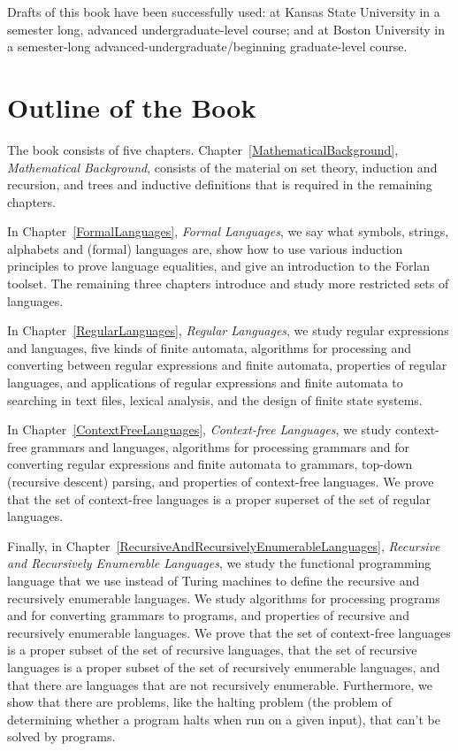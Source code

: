 Drafts of this book have been successfully used: at Kansas State
University in a semester long, advanced undergraduate-level course;
and at Boston University in a semester-long
advanced-undergraduate/beginning graduate-level course.

\section*{Outline of the Book}
\label{OutlineOfTheBook}

The book consists of five chapters.
Chapter~\ref{MathematicalBackground}, \emph{Mathematical Background},
consists of the material on set theory, induction and recursion, and
trees and inductive definitions that is required in the remaining
chapters.

In Chapter~\ref{FormalLanguages}, \emph{Formal Languages},
we say what symbols, strings, alphabets and (formal) languages are,
show how to use various induction principles to prove language
equalities, and give an introduction to the Forlan toolset.  The
remaining three chapters introduce and study more restricted sets of
languages.

In Chapter~\ref{RegularLanguages}, \emph{Regular Languages}, we study
regular expressions and languages, five kinds of finite automata,
algorithms for processing and converting between regular expressions
and finite automata, properties of regular languages, and applications
of regular expressions and finite automata to searching in text files,
lexical analysis, and the design of finite state systems.

In Chapter~\ref{ContextFreeLanguages}, \emph{Context-free Languages},
we study context-free grammars and languages, algorithms for
processing grammars and for converting regular expressions and finite
automata to grammars, top-down (recursive descent) parsing, and
properties of context-free languages.  We prove that the set of context-free
languages is a proper superset of the set of regular languages.

Finally, in Chapter~\ref{RecursiveAndRecursivelyEnumerableLanguages},
\emph{Recursive and Recursively Enumerable Languages}, we study the
functional programming language that we use instead of Turing machines
to define the recursive and recursively enumerable languages.  We
study algorithms for processing programs and for converting grammars
to programs, and properties of recursive and recursively enumerable
languages.  We prove that the set of context-free languages is a
proper subset of the set of recursive languages, that the set of
recursive languages is a proper subset of the set of recursively
enumerable languages, and that there are languages that are not
recursively enumerable.  Furthermore, we show that there are problems,
like the halting problem (the problem of determining whether a program
halts when run on a given input), that can't be solved by programs.

